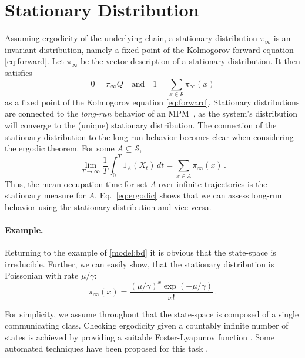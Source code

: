 \section{Stationary Distribution}\label{sec:stationary_dist}
Assuming
ergodicity  
of the underlying chain, a stationary distribution $\pi_{\infty}$ is an invariant distribution, namely a fixed point of the Kolmogorov forward equation \eqref{eq:forward}.
Let $\pi_{\infty}$ be the vector description of a stationary distribution. It then  satisfies
\begin{equation}\label{eq:stationary}
0=\pi_{\infty}Q\quad\text{and}\quad 1=\sum_{x\in\mathcal{S}}\pi_{\infty}(x)
\end{equation}
as a fixed point of the Kolmogorov equation \eqref{eq:forward}.
Stationary distributions are connected to the \emph{long-run} behavior of an \ac{MPM}~\cite{dayar2011bounding}, as the system's distribution will converge to the (unique)
stationary distribution.
The connection of the stationary distribution to the long-run behavior becomes clear when considering the ergodic theorem. 
For some $A\subseteq\mathcal{S}$,
\begin{equation}\label{eq:ergodic}
    \lim_{T\to\infty}\frac{1}{T}\int_0^T 1_A(X_t)\,dt
    = \sum_{x\in A}\pi_{\infty}(x)\,.
\end{equation}
Thus, the mean occupation time for set $A$ over infinite trajectories is the stationary measure for $A$.
Eq.~\eqref{eq:ergodic} shows that we can assess long-run behavior using the stationary distribution and vice-versa.

\paragraph{Example.} Returning to the example of \autoref{model:bd} it is obvious that the state-space is irreducible.
Further, we can easily show, that the stationary distribution is Poissonian with rate $\mu/\gamma$:
$$ \pi_{\infty}(x)=\frac{{(\mu/\gamma)}^{x}\exp(-\mu/\gamma)}{x!}\,.$$


For simplicity, we assume throughout that the state-space is composed of a single communicating class.
Checking ergodicity given a countably infinite number of states is achieved by providing a suitable Foster-Lyapunov function \cite{meyn2012markov}.
Some automated techniques have been proposed for this task \cite{dayar2011bounding,gupta2014scalable,milias2014optimization}.



